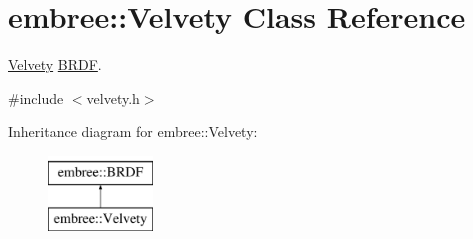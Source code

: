 \hypertarget{classembree_1_1_velvety}{
\section{embree::Velvety Class Reference}
\label{classembree_1_1_velvety}
}


\hyperlink{classembree_1_1_velvety}{Velvety} \hyperlink{classembree_1_1_b_r_d_f}{BRDF}.  




{\ttfamily \#include $<$velvety.h$>$}

Inheritance diagram for embree::Velvety:\begin{figure}[H]
\begin{center}
\leavevmode
\includegraphics[height=2.000000cm]{classembree_1_1_velvety}
\end{center}
\end{figure}
